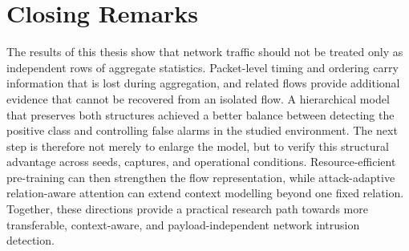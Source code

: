 \documentclass[11pt,fleqn]{report}
\begin{document}
\section{Closing Remarks}
\label{subsec:conclusion_closing}

The results of this thesis show that network traffic should not be treated only
as independent rows of aggregate statistics. Packet-level timing and ordering
carry information that is lost during aggregation, and related flows provide
additional evidence that cannot be recovered from an isolated flow. A
hierarchical model that preserves both structures achieved a better balance
between detecting the positive class and controlling false alarms in the
studied environment. The next step is therefore not merely to enlarge the
model, but to verify this structural advantage across seeds, captures, and
operational conditions. Resource-efficient pre-training can then strengthen the
flow representation, while attack-adaptive relation-aware attention can extend
context modelling beyond one fixed relation. Together, these directions provide
a practical research path towards more transferable, context-aware, and
payload-independent network intrusion detection.





\end{document}
